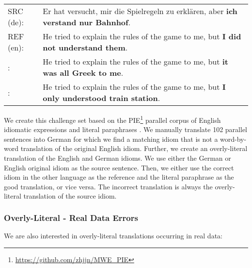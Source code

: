 \documentclass[11pt]{article}
\newcommand{\cmark}{\textcolor{darkpastelgreen}{\ding{51}}}\newcommand{\xmark}{\textcolor{darkpastelred}{\ding{55}}}
\begin{document}
\begin{small}
\vspace{0.5cm}
\setlength{\extrarowheight}{0.1cm}
\begin{tabularx}{0.95\columnwidth}{lX}
     SRC (de): & Er hat versucht, mir die Spielregeln zu erklären, aber \textbf{ich verstand nur Bahnhof}. \\
     REF (en): & He tried to explain the rules of the game to me, but \textbf{I did not understand them}. \\
     \cmark: & He tried to explain the rules of the game to me, but \textbf{it was all Greek to me}. \\
     \xmark: & He tried to explain the rules of the game to me, but \textbf{I only understood train station}. \vspace{0.35cm}
\end{tabularx}
\end{small}

We create this challenge set based on the PIE\footnote{\url{https://github.com/zhjjn/MWE_PIE}} parallel corpus of English idiomatic expressions and literal paraphrases \citep{zhou-etal-2021-pie}. We manually translate 102 parallel sentences into German for which we find a matching idiom that is not a word-by-word translation of the original English idiom. Further, we create an overly-literal translation of the English and German idioms. We use either the German or English original idiom as the source sentence. Then, we either use the correct idiom in the other language as the reference and the literal paraphrase as the good translation, or vice versa. The incorrect translation is always the overly-literal translation of the source idiom.


\subsubsection{Overly-Literal - Real Data Errors}
\label{subsec:real_overly_literal}

We are also interested in overly-literal translations occurring in real data: 
\end{document}
